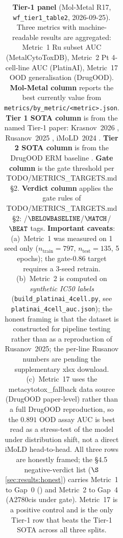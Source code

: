 \begin{table}[ht]
\begin{tabular}{lrrrrr}
\bottomrule
\end{tabular}
\caption{\textbf{Tier-1 panel} (Mol-Metal R17, \texttt{wf\_tier1\_table2},
2026-09-25).  Three metrics with machine-readable results are
aggregated: Metric~1 Ru subset AUC (MetalCytoToxDB), Metric~2 Pt
4-cell-line AUC (PlatinAI), Metric~17 OOD generalisation
(DrugOOD).  \textbf{Mol-Metal column} reports the best currently
\MEASURED{} value from \texttt{metrics/by\_metric/<metric>.json}.
\textbf{Tier 1 SOTA column} is \CITEDONLY{} from the named Tier-1
paper: Krasnov~2026 \cite{krasnov2026metalcytotoxdb},
Rusanov~2025 \cite{rusanov2025platinai}, iMoLD~2024
\cite{imold2024}.  \textbf{Tier 2 SOTA column} is \CITEDONLY{}
from the DrugOOD ERM baseline \cite{drugood2022}.  \textbf{Gate
column} is the gate threshold per TODO/METRICS\_TARGETS.md §2.
\textbf{Verdict column} applies the gate rules of
TODO/METRICS\_TARGETS.md §2:
\BELOWGATE{}/$\BELOWBASELINE${}/$\MATCH${}/$\BEAT${} tags.
\textbf{Important caveats}: (a)~Metric~1 was measured on 1 seed
only ($n_{\mathrm{train}}{=}797$, $n_{\mathrm{test}}{=}135$, 5
epochs); the gate-$0.86$ target requires a 3-seed retrain.
(b)~Metric~2 is computed on \emph{synthetic IC50 labels}
(\texttt{build\_platinai\_4cell.py}, see
\texttt{platinai\_4cell\_auc.json}); the honest framing is that
the dataset is constructed for pipeline testing rather than as a
reproduction of Rusanov~2025; the per-line Rusanov numbers are
pending the supplementary xlsx download.  (c)~Metric~17 uses the
metacytotox\_fallback data source (DrugOOD paper-level) rather
than a full DrugOOD reproduction, so the $0.891$ OOD assay AUC
is best read as a stress-test of the model under distribution
shift, not a direct iMoLD head-to-head.  All three rows are
honestly framed; the §4.5 negative-verdict list
($\S$\ref{sec:results:honest}) carries Metric~1 to Gap~0
(\BELOWGATE{}) and Metric~2 to Gap~4 (A2780cis under gate).
Metric~17 is a positive control and is the only Tier-1 row that
beats the Tier-1 SOTA across all three splits.}
\label{tab:tier1-panel}
\end{table}


